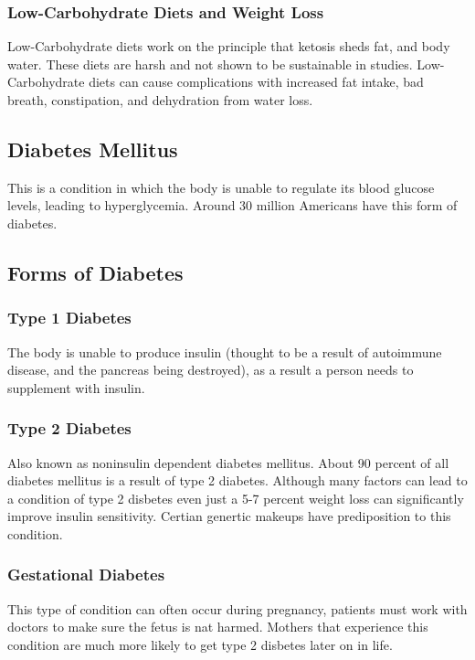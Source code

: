\documentclass[letterpaper, 11pt]{article}
\begin{document}
\subsubsection{Low-Carbohydrate Diets and Weight Loss}
\label{sec:org2568675}
Low-Carbohydrate diets work on the principle that ketosis sheds fat, and body water. These diets are harsh and not shown to be sustainable in studies. Low-Carbohydrate diets can cause complications with increased fat intake, bad breath, constipation, and dehydration from water loss.\\
\subsection{Diabetes Mellitus}
\label{sec:org2baeb45}
This is a condition in which the body is unable to regulate its blood glucose levels, leading to hyperglycemia. Around 30 million Americans have this form of diabetes.\\
\subsection{Forms of Diabetes}
\label{sec:org10833c8}
\subsubsection{Type 1 Diabetes}
\label{sec:org164c2a6}
The body is unable to produce insulin (thought to be a result of autoimmune disease, and the pancreas being destroyed), as a result a person needs to supplement with insulin.\\
\subsubsection{Type 2 Diabetes}
\label{sec:org2a37fe8}
Also known as noninsulin dependent diabetes mellitus. About 90 percent of all diabetes mellitus is a result of type 2 diabetes. Although many factors can lead to a condition of type 2 disbetes even just a 5-7 percent weight loss can significantly improve insulin sensitivity. Certian genertic makeups have prediposition to this condition.\\
\subsubsection{Gestational Diabetes}
\label{sec:orgf2b47f8}
This type of condition can often occur during pregnancy, patients must work with doctors to make sure the fetus is nat harmed. Mothers that experience this condition are much more likely to get type 2 disbetes later on in life.\\
\end{document}
